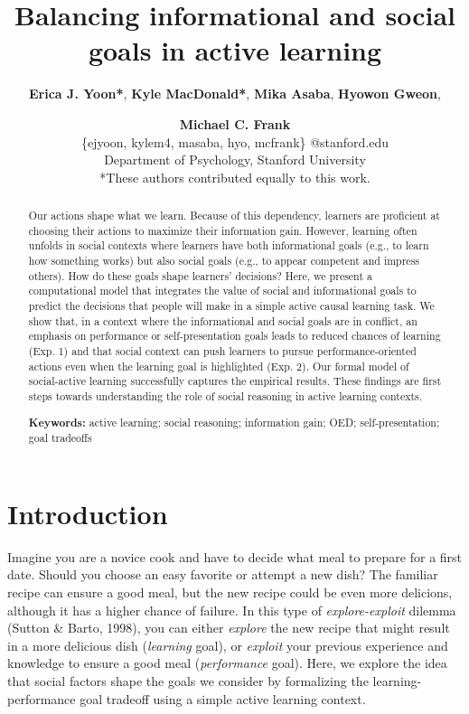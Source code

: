 \documentclass[10pt, letterpaper]{article}
\title{Balancing informational and social goals in active learning}
\author{{\large \bf Erica J. Yoon*}, {\large \bf Kyle MacDonald*}, {\large \bf Mika Asaba}, {\large \bf Hyowon Gweon}, \and {\large \bf Michael C. Frank} \\ \{ejyoon, kylem4, masaba, hyo, mcfrank\} @stanford.edu \\ Department of Psychology, Stanford University \\ *These authors contributed equally to this work.}
\begin{document}
\maketitle

\begin{abstract}
Our actions shape what we learn. Because of this dependency, learners
are proficient at choosing their actions to maximize their information
gain. However, learning often unfolds in social contexts where learners
have both informational goals (e.g., to learn how something works) but
also social goals (e.g., to appear competent and impress others). How do
these goals shape learners' decisions? Here, we present a computational
model that integrates the value of social and informational goals to
predict the decisions that people will make in a simple active causal
learning task. We show that, in a context where the informational and
social goals are in conflict, an emphasis on performance or
self-presentation goals leads to reduced chances of learning (Exp. 1)
and that social context can push learners to pursue performance-oriented
actions even when the learning goal is highlighted (Exp. 2). Our formal
model of social-active learning successfully captures the empirical
results. These findings are first steps towards understanding the role
of social reasoning in active learning contexts.

\textbf{Keywords:}
active learning; social reasoning; information gain; OED;
self-presentation; goal tradeoffs
\end{abstract}

\hypertarget{introduction}{%
\section{Introduction}\label{introduction}}

Imagine you are a novice cook and have to decide what meal to prepare
for a first date. Should you choose an easy favorite or attempt a new
dish? The familiar recipe can ensure a good meal, but the new recipe
could be even more delicions, although it has a higher chance of
failure. In this type of \emph{explore-exploit} dilemma (Sutton \&
Barto, 1998), you can either \emph{explore} the new recipe that might
result in a more delicious dish (\emph{learning} goal), or
\emph{exploit} your previous experience and knowledge to ensure a good
meal (\emph{performance} goal). Here, we explore the idea that social
factors shape the goals we consider by formalizing the
learning-performance goal tradeoff using a simple active learning
context.
\end{document}
